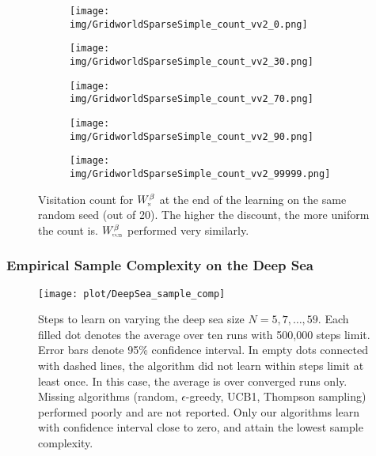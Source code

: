 \documentclass{article}
\newcommand{\textsub}[1]{\textsc{\tiny #1}} \newcommand{\func}[2]{\textsf{#1}(#2)} \newcommand{\hl}[1]{\textcolor{red}{{#1}}} \newcommand{\hll}[1]{\textcolor{blue}{{#1}}}
\begin{document}
\begin{figure}[t]
	\centering 
	\begin{subfigure}[b]{.18\linewidth} 
		\centering 
		\texttt{[image: img/GridworldSparseSimple\_count\_vv2\_0.png]}
	\end{subfigure}
	\hfill
	\begin{subfigure}[b]{.18\linewidth} 
		\centering 
		\texttt{[image: img/GridworldSparseSimple\_count\_vv2\_30.png]}
	\end{subfigure} 
	\hfill
	\begin{subfigure}[b]{.18\linewidth} 
		\centering 
		\texttt{[image: img/GridworldSparseSimple\_count\_vv2\_70.png]}
	\end{subfigure}
	\hfill
	\begin{subfigure}[b]{.18\linewidth} 
		\centering 
		\texttt{[image: img/GridworldSparseSimple\_count\_vv2\_90.png]}
	\end{subfigure} 
	\hfill
	\begin{subfigure}[b]{.18\linewidth} 
		\centering 
		\texttt{[image: img/GridworldSparseSimple\_count\_vv2\_99999.png]}
	\end{subfigure} 
	\caption{\label{fig:gamma_count} Visitation count for $W^\beta_{\textsub{n}}$ at the end of the learning on the same random seed (out of 20). The higher the discount, the more uniform the count is. $W^\beta_{\textsub{ucb}}$ performed very similarly.}
\end{figure} 




\subsubsection{Empirical Sample Complexity on the Deep Sea}
\label{sssec:empirical_sample_deep}

\begin{figure}[t]
	\centering
	\texttt{[image: plot/DeepSea\_sample\_comp]}
	\caption{\label{fig:empirical_sample_deep} Steps to learn on varying the deep sea size $N = 5, 7, \ldots, 59$. Each filled dot denotes the average over ten runs with 500,000 steps limit. Error bars denote 95\% confidence interval. In empty dots connected with dashed lines, the algorithm did not learn within steps limit at least once. In this case, the average is over converged runs only. Missing algorithms (random, $\epsilon$-greedy, UCB1, Thompson sampling) performed poorly and are not reported. Only our algorithms learn with confidence interval close to zero, and attain the lowest sample complexity.}
\end{figure}
\end{document}
